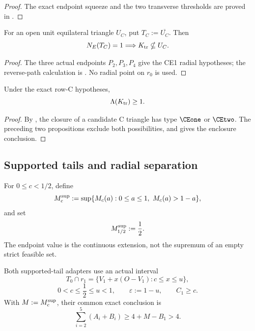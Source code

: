\begin{proof}
The exact endpoint squeeze and the two transverse thresholds are proved in
.
\end{proof}

\begin{proposition}
\label{prop:readable-k410-ce1}
For an open unit equilateral triangle \(U_C\), put
\(T_C:=\overline{U_C}\).  Then
\[
 N_E(T_C)=1\Longrightarrow K_{\rm tr}\nsubseteq U_C.
\]
\end{proposition}

\begin{proof}
The three actual endpoints \(P_2,P_3,P_4\) give the CE1 radial hypotheses;
the reverse-path calculation is .
No radial point on \(r_0\) is used.
\end{proof}

\begin{proposition}
\label{prop:new-nplus-one-all-vd0}
Under the exact row-C hypotheses,
\[
 \Lambda(K_{\rm tr})\ge1.
\]
\end{proposition}

\begin{proof}
By , the closure of a candidate C triangle has
type \(\CEone\) or \(\CEtwo\).
The preceding two propositions exclude both possibilities, and
 gives the enclosure conclusion.
\end{proof}


\FloatBarrier

\subsection{Supported tails and radial separation}

For \(0\le c<1/2\), define
\[
 M_c^{\rm sup}:=
 \sup\{M_c(a):0\le a\le1,\ M_c(a)>1-a\},
\]
and set
\[
 M_{1/2}^{\rm sup}:=\frac12.
\]
The endpoint value is the continuous extension, not the supremum of an empty
strict feasible set.

Both supported-tail adapters use an actual interval
\[
 T_0\cap r_1=\{V_1+x(O-V_1):c\le x\le u\},
\]
\[
 0<c\le\frac12\le u<1,
 \qquad
 \varepsilon:=1-u,
 \qquad
 C_1\ge c.
\]
With \(M:=M_c^{\rm sup}\), their common exact conclusion is
\[
 \sum_{i=2}^5(A_i+B_i)\ge4+M-B_1>4.
\]

